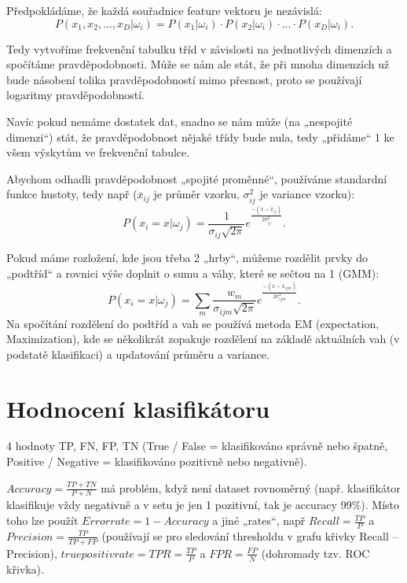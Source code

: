 \documentclass[12pt]{article}					%
\begin{document}
    \begin{definice}
        Předpokládáme, že každá souřadnice feature vektoru je nezávislá:
        $$ P(x_1, x_2, …, x_D|\omega_i) = P(x_1|\omega_i) · P(x_2|\omega_i) · … · P(x_D|\omega_i). $$

        Tedy vytvoříme frekvenční tabulku tříd v závislosti na jednotlivých dimenzích a spočítáme pravděpodobnosti. Může se nám ale stát, že při mnoha dimenzích už bude násobení tolika pravděpodobností mimo přesnost, proto se používají logaritmy pravděpodobností.

        Navíc pokud nemáme dostatek dat, snadno se nám může (na „nespojité dimenzi“) stát, že pravděpodobnost nějaké třídy bude nula, tedy „přidáme“ 1 ke všem výskytům ve frekvenční tabulce.

        Abychom odhadli pravděpodobnost „spojité proměnné“, používáme standardní funkce hustoty, tedy např ($\overline{x}_{ij}$ je průměr vzorku, $\sigma^2_{ij}$ je variance vzorku): 
        $$ P(x_i = x|\omega_j) = \frac{1}{\sigma_{ij}\sqrt{2\pi}}e^{\frac{-(x-\overline{x}_{ij})}{2\sigma^2_{ij}}}. $$

        Pokud máme rozložení, kde jsou třeba 2 „hrby“, můžeme rozdělit prvky do „podtříd“ a rovnici výše doplnit o sumu a váhy, které se sečtou na 1 (GMM):
        $$ P(x_i = x|\omega_j) = \sum_{m}\frac{w_m}{\sigma_{ijm}\sqrt{2\pi}}e^{\frac{-(x-\overline{x}_{ijm})}{2\sigma^2_{ijm}}}. $$ 
        Na spočítání rozdělení do podtříd a vah se používá metoda EM (expectation, Maximization), kde se několikrát zopakuje rozdělení na základě aktuálních vah (v podstatě klasifikaci) a updatování průměru a variance.
    \end{definice}


\section{Hodnocení klasifikátoru}
    \begin{definice}
        4 hodnoty TP, FN, FP, TN (True / False = klasifikováno správně nebo špatně, Positive / Negative = klasifikováno pozitivně nebo negativně).
        
        $ Accuracy = \frac{TP + TN}{P + N} $ má problém, když není dataset rovnoměrný (např. klasifikátor klasifikuje vždy negativně a v setu je jen 1 pozitivní, tak je accuracy 99\%). Místo toho lze použít $Error rate = 1 - Accuracy$ a jiné „rates“, např $Recall = \frac{TP}{P}$ a $Precision = \frac{TP}{TP + FP}$ (používají se pro sledování thresholdu v grafu křivky Recall -- Precision), $true positiv rate = TPR = \frac{TP}{P}$ a $FPR = \frac{FP}{N}$ (dohromady tzv. ROC křivka).
    \end{definice}
\end{document}
